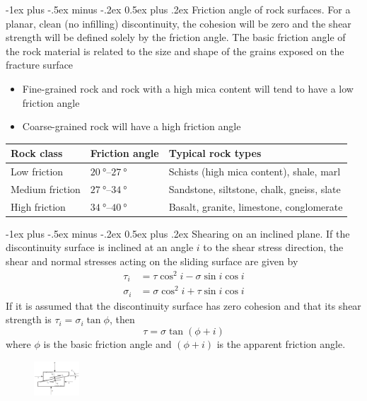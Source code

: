 \documentclass[10pt,landscape,a4paper]{article}
\makeatletter
\renewcommand{\section}{\@startsection{section}{1}{0mm}%
	{-1ex plus -.5ex minus -.2ex}%
	{0.5ex plus .2ex}%
	{\normalfont\large\bfseries}}
\makeatother
\begin{document}
\begin{multicols}{3}
		\section{Friction angle of rock surfaces.}
		For a planar, clean (no infilling) discontinuity, the cohesion will be zero and the shear strength will be defined solely by the friction angle.
		The basic friction angle of the rock material is related to the size and shape of the grains exposed on the fracture surface
		\begin{itemize}
			\item Fine-grained rock and rock with a high mica content will tend to have a low friction angle
			\item Coarse-grained rock will have a high friction angle
		\end{itemize}
		\begin{table}[H]\scriptsize\centering\begin{tabular}{lll}
			Rock class & Friction angle & Typical rock types\\
			\hline
			Low friction & $\SIrange{20}{27}{\degree}$ & Schists (high mica content), shale, marl\\
			Medium friction & $\SIrange{27}{34}{\degree}$ & Sandstone, siltstone, chalk, gneiss, slate\\
			High friction & $\SIrange{34}{40}{\degree}$ & Basalt, granite, limestone, conglomerate
		\end{tabular}\end{table}
		
		\section{Shearing on an inclined plane.}
		If the discontinuity surface is inclined at an angle $i$ to the shear stress direction, the shear and normal stresses acting on the sliding surface are given by
		\begin{align*}
			\tau_i&=\tau\cos^2i-\sigma\sin i\cos i\\
			\sigma_i&=\sigma\cos^2i+\tau\sin i\cos i
		\end{align*}
		If it is assumed that the discontinuity surface has zero cohesion and that its shear strength is $\tau_i=\sigma_i\tan\phi$, then
		\[
			\tau=\sigma\tan(\phi+i)
		\]
		where $\phi$ is the basic friction angle and $(\phi+i)$ is the apparent friction angle.
		\begin{figure}[H]
			\centering
			\includegraphics[width=0.15\textwidth]{shearing-inclined-plane}
		\end{figure}
		

\end{multicols}
\end{document}
